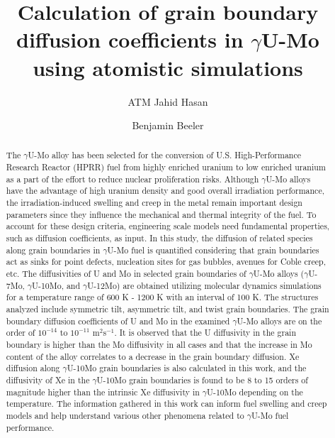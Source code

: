 \documentclass{elsarticle}
\begin{document}
\begin{frontmatter}

\title{Calculation of grain boundary diffusion coefficients in $\gamma$U-Mo using atomistic simulations}

\author[ncsu]{ATM Jahid Hasan}
\author[ncsu,inl]{Benjamin Beeler}

\address[ncsu]{Department of Nuclear Engineering, North Carolina State University, Raleigh, NC 27695, United States}
\address[inl]{Idaho National Laboratory, Idaho Falls, ID 83415, United States}

\begin{abstract}
	The $\gamma$U-Mo alloy has been selected for the conversion of U.S. High-Performance Research Reactor (HPRR) fuel from highly enriched uranium to low enriched uranium as a part of the effort to reduce nuclear proliferation risks. Although $\gamma$U-Mo alloys have the advantage of high uranium density and good overall irradiation performance, the irradiation-induced swelling and creep in the metal remain important design parameters since they influence the mechanical and thermal integrity of the fuel. To account for these design criteria, engineering scale models need fundamental properties, such as diffusion coefficients, as input. In this study, the diffusion of related species along grain boundaries in $\gamma$U-Mo fuel is quantified considering that grain boundaries act as sinks for point defects, nucleation sites for gas bubbles, avenues for Coble creep, etc. The diffusivities of U and Mo in selected grain boundaries of $\gamma$U-Mo alloys ($\gamma$U-7Mo, $\gamma$U-10Mo, and $\gamma$U-12Mo) are obtained utilizing molecular dynamics simulations for a temperature range of 600 K - 1200 K with an interval of 100 K. The structures analyzed include symmetric tilt, asymmetric tilt, and twist grain boundaries. The grain boundary diffusion coefficients of U and Mo in the examined $\gamma$U-Mo alloys are on the order of $10^{-14}$ to $10^{-11}$ m$^2$s$^{-1}$. It is observed that the U diffusivity in the grain boundary is higher than the Mo diffusivity in all cases and that the increase in Mo content of the alloy correlates to a decrease in the grain boundary diffusion. Xe diffusion along $\gamma$U-10Mo grain boundaries is also calculated in this work, and the diffusivity of Xe in the $\gamma$U-10Mo grain boundaries is found to be 8 to 15 orders of magnitude higher than the intrinsic Xe diffusivity in $\gamma$U-10Mo depending on the temperature. The information gathered in this work can inform fuel swelling and creep models and help understand various other phenomena related to $\gamma$U-Mo fuel performance.
\end{abstract}

\end{frontmatter}
\end{document}
